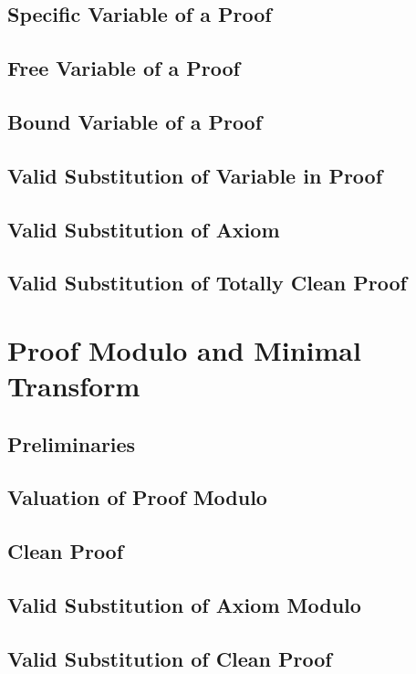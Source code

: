\documentclass{report}
\begin{document}
    \subsection{Specific Variable of a Proof}
      
    \subsection{Free Variable of a Proof}
      
    \subsection{Bound Variable of a Proof}
      
    \subsection{Valid Substitution of Variable in Proof}
      
    \subsection{Valid Substitution of Axiom}
      
    \subsection{Valid Substitution of Totally Clean Proof}
      
\section{Proof Modulo and Minimal Transform}
    \subsection{Preliminaries}
      
    \subsection{Valuation of Proof Modulo}
      
    \subsection{Clean Proof}
      
    \subsection{Valid Substitution of Axiom Modulo}
      
    \subsection{Valid Substitution of Clean Proof}
      
\end{document}
